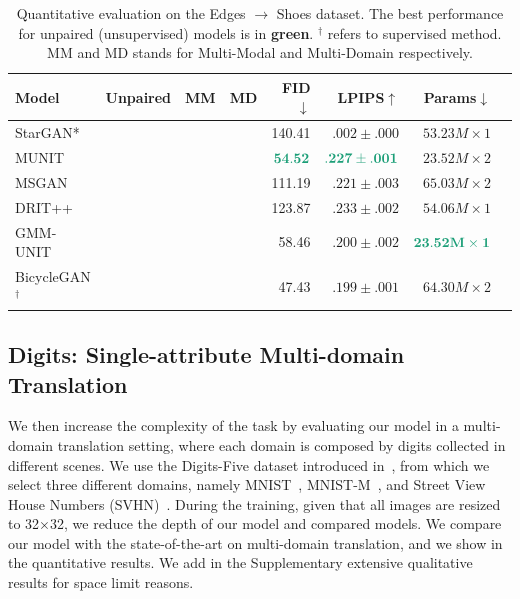\documentclass[runningheads]{llncs}
\newcommand{\bst}[1]{\textcolor[RGB]{27,158,119}{\mathbf{#1}}}
\newcommand{\bstt}[1]{\textcolor[RGB]{27,158,119}{\textbf{#1}}}
\begin{document}
\begin{table}[ht]
    \caption{Quantitative evaluation on the Edges $\to$ Shoes dataset. The best performance for unpaired (unsupervised) models is in \bstt{green}. $^\dag$ refers to supervised method. MM and MD stands for Multi-Modal and Multi-Domain respectively.}
    \setlength{\tabcolsep}{4pt}
    \footnotesize
	\centering
	\begin{tabular}{@{}l ccc @{\quad} rr @{\quad} r @{\quad} r@{}}
	\toprule
	\textbf{Model} & \textbf{Unpaired} & \textbf{MM} & \textbf{MD} & \textbf{FID}$\downarrow$ & \textbf{LPIPS}$\uparrow$ & \textbf{Params$\downarrow$} 
	\\
	\midrule
	StarGAN*~\cite{choi2018stargan} & \checkmark && \checkmark & 140.41 & $.002\pm .000$ & $53.23M\times1$ \\
	MUNIT~\cite{huang2018multimodal} & \checkmark & \checkmark & & $\bst{54.52}$ & $\bst{.227\pm .001}$ & $23.52M\times2$ \\
	MSGAN~\cite{MSGAN} & \checkmark &\checkmark & & 111.19 & $.221\pm .003$ & $65.03M\times2$ \\
	DRIT++~\cite{lee2019drit++} & \checkmark &\checkmark & \checkmark & 123.87 & $.233\pm .002$ & $54.06M\times1$ \\
	GMM-UNIT & \checkmark &\checkmark & \checkmark & 58.46 & $.200 \pm .002$ &  $\bst{23.52M \times 1}$\\\midrule
	BicycleGAN$^\dag$~\cite{zhu2017toward} && \checkmark & & 47.43 & $.199\pm .001$ & $64.30M\times2$ \\  
	\bottomrule
	\end{tabular}
	\label{tab:QuantitativeResults_edges2shoes}
\end{table}




\subsection{Digits: Single-attribute Multi-domain Translation}
We then increase the complexity of the task by evaluating our model in a multi-domain translation setting, where each domain is composed by digits collected in different scenes. We use the Digits-Five dataset introduced in~\cite{xu2018deep}, from which we select three different domains, namely MNIST~\cite{lecun1998gradient}, MNIST-M~\cite{ganin2014unsupervised}, and Street View House Numbers (SVHN)~\cite{yuval2011reading}. During the training, given that all images are resized to 32$\times$32, we reduce the depth of our model and compared models. 
We compare our model with the state-of-the-art on multi-domain translation, and we show in  the quantitative results. We add in the Supplementary extensive qualitative results for space limit reasons.
\end{document}
